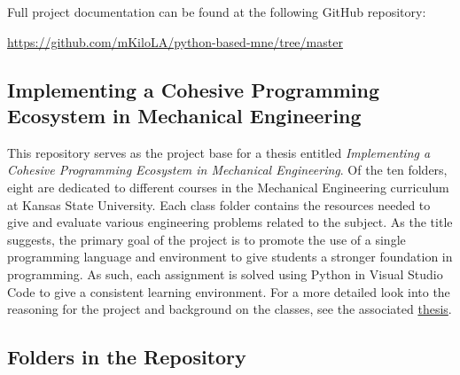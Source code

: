 Full project documentation can be found at the following GitHub repository: 

\begin{center}
    \url{https://github.com/mKiloLA/python-based-mne/tree/master}
\end{center}

\subsection*{Implementing a Cohesive Programming Ecosystem in Mechanical Engineering}

This repository serves as the project base for a thesis entitled
\textit{Implementing a Cohesive Programming Ecosystem in Mechanical Engineering}. 
Of the ten folders, eight are dedicated to different courses in the Mechanical 
Engineering curriculum at Kansas State University. Each class folder contains the 
resources needed to give and evaluate various engineering problems related to the 
subject. As the title suggests, the primary goal of the project is to promote the 
use of a single programming language and environment to give students a stronger 
foundation in programming. As such, each assignment is solved using Python in Visual 
Studio Code to give a consistent learning environment. For a more detailed look into 
the reasoning for the project and background on the classes, see the associated 
\href{https://github.com/mKiloLA/python-based-mne/tree/master/thesis}{thesis}.

\subsection*{Folders in the Repository}

